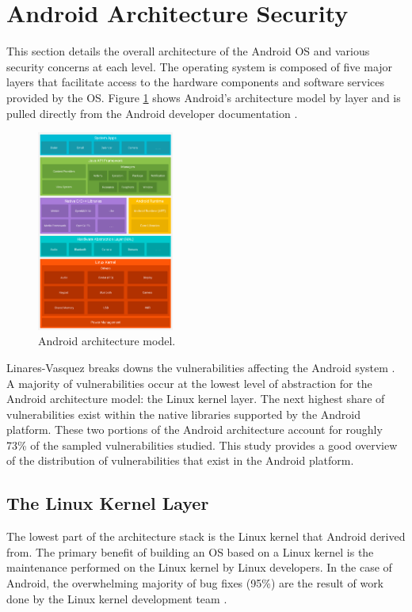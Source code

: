 \section{Android Architecture Security}
This section details the overall architecture of the Android OS and various security concerns at each level.
The operating system is composed of five major layers that facilitate access to the hardware components and software services provided by the OS.
Figure \ref{fig:AndroidArch} shows Android's architecture model by layer and is pulled directly from the Android developer documentation \cite{AndroidDocs2022Arch}.

\begin{figure}[htbp]
    \centerline{\includegraphics[width=0.4\textwidth]{figures/AndroidArch.png}}
    \caption{Android architecture model.}
    \label{fig:AndroidArch}
\end{figure}

Linares-Vasquez \etal breaks downs the vulnerabilities affecting the Android system \cite{LinaresVasquez2017}.
A majority of vulnerabilities occur at the lowest level of abstraction for the Android architecture model: the Linux kernel layer.
The next highest share of vulnerabilities exist within the native libraries supported by the Android platform.
These two portions of the Android architecture account for roughly 73\% of the sampled vulnerabilities studied.
This study provides a good overview of the distribution of vulnerabilities that exist in the Android platform.

\subsection{The Linux Kernel Layer}
The lowest part of the architecture stack is the Linux kernel that Android derived from.
The primary benefit of building an OS based on a Linux kernel is the maintenance performed on the Linux kernel by Linux developers.
In the case of Android, the overwhelming majority of bug fixes (95\%) are the result of work done by the Linux kernel development team \cite{Khomh2012}.

